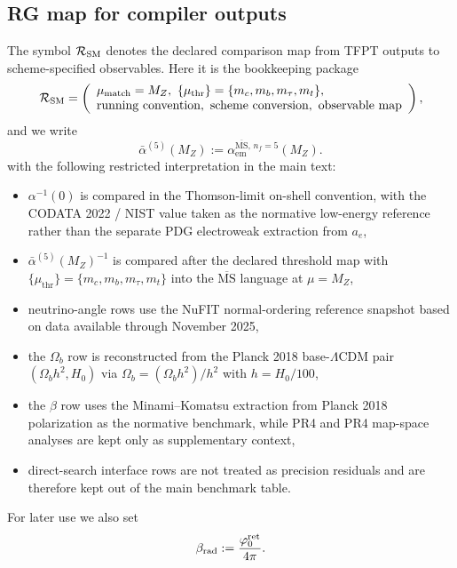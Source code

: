 \subsection{RG map for compiler outputs}
\label{sec:rg-map-compiler-outputs}

The symbol $\mathcal R_{\mathrm{SM}}$ denotes the declared comparison map from TFPT outputs to scheme-specified observables. Here it is the bookkeeping package
\[
\mathcal R_{\SM}
=
\left(
\begin{array}{l}
\mu_{\mathrm{match}}=M_Z,\ \{\mu_{\mathrm{thr}}\}=\{m_c,m_b,m_\tau,m_t\},\\
\text{running convention},\ \text{scheme conversion},\ \text{observable map}
\end{array}
\right),
\]
and we write
\[
\bar\alpha^{(5)}(M_Z):=\alpha_{\mathrm{em}}^{\overline{\mathrm{MS}},\,n_f=5}(M_Z).
\]
with the following restricted interpretation in the main text:
\begin{itemize}[leftmargin=1.5em, topsep=3pt, itemsep=2pt]
    \item $\alpha^{-1}(0)$ is compared in the Thomson-limit on-shell convention, with the CODATA 2022 / NIST value taken as the normative low-energy reference rather than the separate PDG electroweak extraction from $a_e$,
    \item $\bar\alpha^{(5)}(M_Z)^{-1}$ is compared after the declared threshold map with $\{\mu_{\mathrm{thr}}\}=\{m_c,m_b,m_\tau,m_t\}$ into the $\overline{\mathrm{MS}}$ language at $\mu=M_Z$,
    \item neutrino-angle rows use the NuFIT normal-ordering reference snapshot based on data available through November 2025,
    \item the $\Omega_b$ row is reconstructed from the Planck 2018 base-$\Lambda$CDM pair $(\Omega_b h^2,H_0)$ via $\Omega_b=(\Omega_b h^2)/h^2$ with $h=H_0/100$,
    \item the $\beta$ row uses the Minami--Komatsu extraction from Planck 2018 polarization as the normative benchmark, while PR4 and PR4 map-space analyses are kept only as supplementary context,
    \item direct-search interface rows are not treated as precision residuals and are therefore kept out of the main benchmark table.
\end{itemize}
For later use we also set
\[
\beta_{\mathrm{rad}}:=\frac{\varphi_0^{\mathrm{ret}}}{4\pi}.
\]

